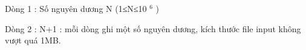 Dòng 1 : Số nguyên dương N (1≤N≤10   $^    6   $   )  

   Dòng 2 : N+1 : mỗi dòng ghi một số nguyên dương, kích thước file input không vượt quá 1MB.  

\